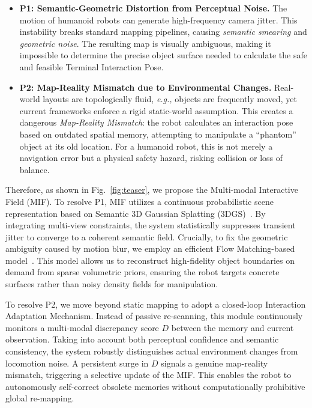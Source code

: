 \documentclass[conference]{IEEEtran}
\begin{document}
\begin{itemize}
    \item \textbf{P1: Semantic-Geometric Distortion from Perceptual Noise.} 
    The motion of humanoid robots can generate high-frequency camera jitter. This instability breaks standard mapping pipelines, causing \textit{semantic smearing} and \textit{geometric noise}. The resulting map is visually ambiguous, making it impossible to determine the precise object surface needed to calculate the safe and feasible Terminal Interaction Pose.
    
    \item \textbf{P2: Map-Reality Mismatch due to Environmental Changes.} 
    Real-world layouts are topologically fluid, \emph{e.g.,} objects are frequently moved, yet current frameworks enforce a rigid static-world assumption. This creates a dangerous \textit{Map-Reality Mismatch}: the robot calculates an interaction pose based on outdated spatial memory, attempting to manipulate a ``phantom'' object at its old location. For a humanoid robot, this is not merely a navigation error but a physical safety hazard, risking collision or loss of balance.
\end{itemize}

Therefore, as shown in Fig.~\ref{fig:teaser}, we propose the Multi-modal Interactive Field (MIF). To resolve P1, MIF utilizes a continuous probabilistic scene representation based on Semantic 3D Gaussian Splatting (3DGS)~\cite{kerbl20233d}. By integrating multi-view constraints, the system statistically suppresses transient jitter to converge to a coherent semantic field. Crucially, to fix the geometric ambiguity caused by motion blur, we employ an efficient Flow Matching-based model~\cite{chen2025sam, lipman2022flow}. This model allows us to reconstruct high-fidelity object boundaries on demand from sparse volumetric priors, ensuring the robot targets concrete surfaces rather than noisy density fields for manipulation.

To resolve P2, we move beyond static mapping to adopt a closed-loop Interaction Adaptation Mechanism. Instead of passive re-scanning, this module continuously monitors a multi-modal discrepancy score $D$ between the memory and current observation. Taking into account both perceptual confidence and semantic consistency, the system robustly distinguishes actual environment changes from locomotion noise. A persistent surge in $D$ signals a genuine map-reality mismatch, triggering a selective update of the MIF. This enables the robot to autonomously self-correct obsolete memories without computationally prohibitive global re-mapping.
\end{document}
